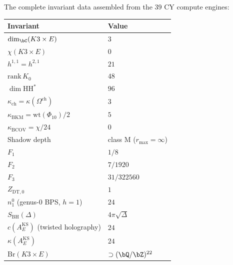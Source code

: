 \begin{remark}
\label{rem:master-data-k3xe}
The complete invariant data assembled from the $39$ CY compute
engines:
\begin{center}
\small
\renewcommand{\arraystretch}{1.3}
\begin{tabular}{ll}
\textbf{Invariant} & \textbf{Value} \\
\hline
$\dim_\bC(K3 \times E)$ & $3$ \\
$\chi(K3 \times E)$ & $0$ \\
$h^{1,1} = h^{2,1}$ & $21$ \\
$\mathrm{rank}\,K_0$ & $48$ \\
$\dim \mathrm{HH}^*$ & $96$ \\
$\kappa_{\mathrm{ch}} = \kappa(\Omega^{\mathrm{ch}})$ & $3$ \\
$\kappa_{\mathrm{BKM}} = \mathrm{wt}(\Phi_{10})/2$ & $5$ \\
$\kappa_{\mathrm{BCOV}} = \chi/24$ & $0$ \\
Shadow depth & class M ($r_{\max} = \infty$) \\
$F_1$ & $1/8$ \\
$F_2$ & $7/1920$ \\
$F_3$ & $31/322560$ \\
$Z_{\mathrm{DT},0}$ & $1$ \\
$n^0_1$ (genus-$0$ BPS, $h = 1$) & $24$ \\
$S_{\mathrm{BH}}(\Delta)$ & $4\pi\sqrt{\Delta}$ \\
$c(A_E^{\mathrm{KS}})$ (twisted holography) & $24$ \\
$\kappa(A_E^{\mathrm{KS}})$ & $24$ \\
$\mathrm{Br}(K3 \times E)$ & $\supset (\bQ/\bZ)^{22}$
\end{tabular}
\end{center}
\end{remark}

